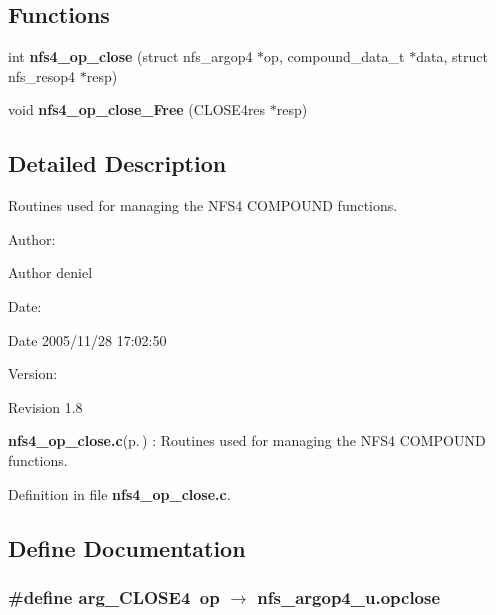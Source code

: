 \subsection*{Functions}
\begin{CompactItemize}
\item 
int {\bf nfs4\_\-op\_\-close} (struct nfs\_\-argop4 $\ast$op, compound\_\-data\_\-t $\ast$data, struct nfs\_\-resop4 $\ast$resp)
\item 
void {\bf nfs4\_\-op\_\-close\_\-Free} (CLOSE4res $\ast$resp)
\end{CompactItemize}


\subsection{Detailed Description}
Routines used for managing the NFS4 COMPOUND functions. 

\begin{Desc}
\item[Author:]\begin{Desc}
\item[Author]deniel \end{Desc}
\end{Desc}
\begin{Desc}
\item[Date:]\begin{Desc}
\item[Date]2005/11/28 17:02:50 \end{Desc}
\end{Desc}
\begin{Desc}
\item[Version:]\begin{Desc}
\item[Revision]1.8 \end{Desc}
\end{Desc}
{\bf nfs4\_\-op\_\-close.c}{\rm (p.\,\pageref{nfs4__op__close_8c})} : Routines used for managing the NFS4 COMPOUND functions.

Definition in file {\bf nfs4\_\-op\_\-close.c}.

\subsection{Define Documentation}
\subsubsection{\setlength{\rightskip}{0pt plus 5cm}\#define arg\_\-CLOSE4\ op $\rightarrow$ nfs\_\-argop4\_\-u.opclose}\label{nfs4__op__close_8c_a0}


